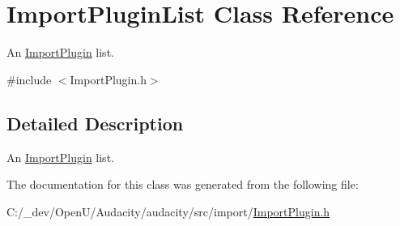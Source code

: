 \hypertarget{class_import_plugin_list}{}\section{Import\+Plugin\+List Class Reference}
\label{class_import_plugin_list}


An \hyperlink{class_import_plugin}{Import\+Plugin} list.  




{\ttfamily \#include $<$Import\+Plugin.\+h$>$}



\subsection{Detailed Description}
An \hyperlink{class_import_plugin}{Import\+Plugin} list. 

The documentation for this class was generated from the following file\+:\begin{DoxyCompactItemize}
\item 
C\+:/\+\_\+dev/\+Open\+U/\+Audacity/audacity/src/import/\hyperlink{_import_plugin_8h}{Import\+Plugin.\+h}\end{DoxyCompactItemize}
